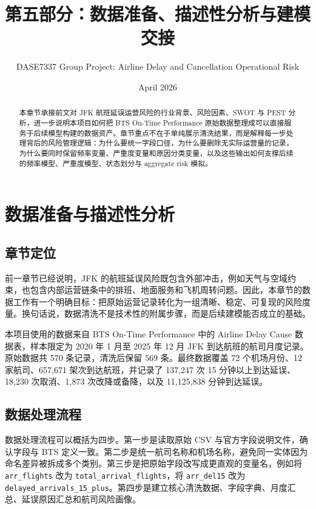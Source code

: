 \documentclass[UTF8,fontset=fandol,11pt]{ctexart}
\title{\textbf{第五部分：数据准备、描述性分析与建模交接}}
\author{DASE7337 Group Project: Airline Delay and Cancellation Operational Risk}
\date{April 2026}
\begin{document}
\maketitle

\begin{abstract}
本章节承接前文对 JFK 航班延误运营风险的行业背景、风险因素、SWOT 与 PEST 分析，进一步说明本项目如何把 BTS On-Time Performance 原始数据整理成可以直接服务于后续模型构建的数据资产。章节重点不在于单纯展示清洗结果，而是解释每一步处理背后的风险管理逻辑：为什么要统一字段口径，为什么要删除无实际运营量的记录，为什么要同时保留频率变量、严重度变量和原因分类变量，以及这些输出如何支撑后续的频率模型、严重度模型、状态划分与 aggregate risk 模拟。
\end{abstract}

\setcounter{section}{4}
\section{数据准备与描述性分析}

\subsection{章节定位}
前一章节已经说明，JFK 的航班延误风险既包含外部冲击，例如天气与空域约束，也包含内部运营链条中的排班、地面服务和飞机周转问题。因此，本章节的数据工作有一个明确目标：把原始运营记录转化为一组清晰、稳定、可复现的风险度量。换句话说，数据清洗不是技术性的附属步骤，而是后续建模能否成立的基础。

本项目使用的数据来自 BTS On-Time Performance 中的 Airline Delay Cause 数据表，样本限定为 2020 年 1 月至 2025 年 12 月 JFK 到达航班的航司月度记录。原始数据共 570 条记录，清洗后保留 569 条。最终数据覆盖 72 个机场月份、12 家航司、657,671 架次到达航班，并记录了 137,247 次 15 分钟以上到达延误、18,230 次取消、1,873 次改降或备降，以及 11,125,838 分钟到达延误。

\subsection{数据处理流程}
数据处理流程可以概括为四步。第一步是读取原始 CSV 与官方字段说明文件，确认字段与 BTS 定义一致。第二步是统一航司名称和机场名称，避免同一实体因为命名差异被拆成多个类别。第三步是把原始字段改写成更直观的变量名，例如将 \texttt{arr\_flights} 改为 \texttt{total\_arrival\_flights}，将 \texttt{arr\_del15} 改为 \texttt{delayed\_arrivals\_15\_plus}。第四步是建立核心清洗数据、字段字典、月度汇总、延误原因汇总和航司风险画像。
\end{document}
